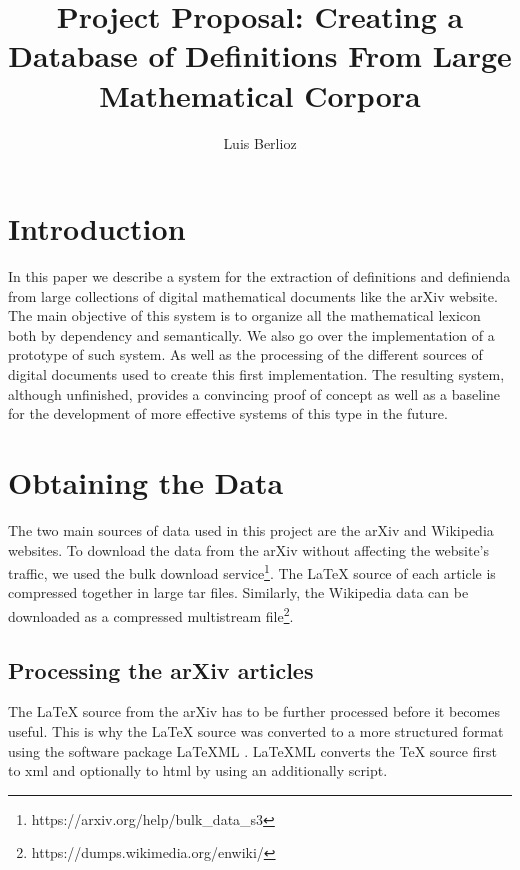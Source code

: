 \documentclass[a4paper]{easychair}
\author{Luis Berlioz}
\title{Project Proposal: Creating a Database of Definitions From Large Mathematical Corpora}
\institute{
    University of Pittsburgh\\
    \email{lab232@pitt.edu}
}
\begin{document}
\maketitle
\begin{abstract}
   
\end{abstract}
\section{Introduction}
In this paper we describe a system for the extraction of definitions and definienda from large collections of digital mathematical documents like the arXiv website. The main objective of this system is to organize all the mathematical lexicon both by dependency and semantically.  We also go over the implementation of a prototype of such system. As well as the processing of the different sources of digital documents used to create this first implementation. The resulting system, although unfinished, provides a convincing proof  of concept as well as a baseline for the development of more effective systems of this type in the future.

\section{Obtaining the Data}
The two main sources of data used in this project are the arXiv and Wikipedia websites. To download the data from the arXiv without affecting the website's traffic, we used the bulk download service\footnote{https://arxiv.org/help/bulk\_data\_s3}. The \LaTeX{} source of each article is compressed together in large tar files. Similarly, the Wikipedia data can be downloaded as a compressed multistream file\footnote{https://dumps.wikimedia.org/enwiki/}. 

\subsection{Processing the arXiv articles}
The \LaTeX{} source from the arXiv has to be further processed before it becomes useful. This is why the \LaTeX{} source was converted to a more structured format using the software package LaTeXML \cite{miller3latexml}. LaTeXML converts the \TeX{} source first to xml and optionally to html by using an additionally script. 
\end{document}
